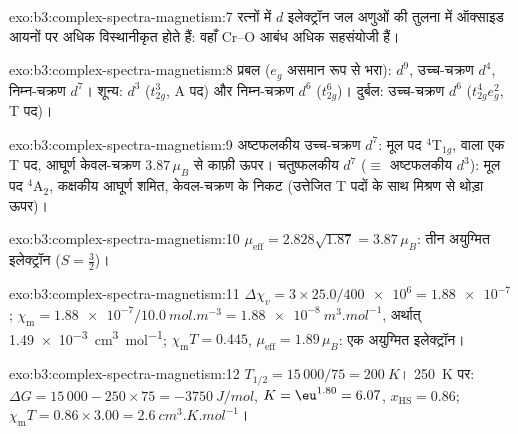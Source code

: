 \begin{solution}{exo:b3:complex-spectra-magnetism:7}
रत्नों में $d$ इलेक्ट्रॉन जल अणुओं की तुलना में ऑक्साइड आयनों पर अधिक
विस्थानीकृत होते हैं: वहाँ Cr--O आबंध अधिक सहसंयोजी हैं।
\end{solution}

\begin{solution}{exo:b3:complex-spectra-magnetism:8}
प्रबल ($e_g$ असमान रूप से भरा): $d^9$, उच्च-चक्रण $d^4$, निम्न-चक्रण $d^7$। शून्य: $d^3$ ($t_{2g}^3$, A पद) और
निम्न-चक्रण $d^6$ ($t_{2g}^6$)। दुर्बल: उच्च-चक्रण $d^6$ ($t_{2g}^4e_g^2$, T पद)।
\end{solution}

\begin{solution}{exo:b3:complex-spectra-magnetism:9}
अष्टफलकीय उच्च-चक्रण $d^7$: मूल पद $^4$T$_{1g}$,  वाला एक T पद,
आघूर्ण केवल-चक्रण $3.87\,\mu_B$ से काफ़ी ऊपर। चतुष्फलकीय $d^7$ ($\equiv$ अष्टफलकीय $d^3$): मूल
पद $^4$A$_2$, कक्षकीय आघूर्ण शमित, केवल-चक्रण के निकट (उत्तेजित T पदों के साथ मिश्रण से
थोड़ा ऊपर)।
\end{solution}

\begin{solution}{exo:b3:complex-spectra-magnetism:10}
$\mu_{\mathrm{eff}} = 2.828\sqrt{1.87} = 3.87\,\mu_B$: तीन अयुग्मित इलेक्ट्रॉन ($S = \frac32$)।
\end{solution}

\begin{solution}{exo:b3:complex-spectra-magnetism:11}
$\Delta\chi_v = 3 \times 25.0/\num{400e6} = \num{1.88e-7}$; $\chi_{\mathrm m} = \num{1.88e-7}/\qty{10.0}{mol.m^{-3}} = \qty{1.88e-8}{m^3.mol^{-1}}$, अर्थात्
\qty{1.49e-3}{cm^3.mol^{-1}}; $\chi_{\mathrm m}T = 0.445$, $\mu_{\mathrm{eff}} = 1.89\,\mu_B$: एक अयुग्मित इलेक्ट्रॉन।
\end{solution}

\begin{solution}{exo:b3:complex-spectra-magnetism:12}
$T_{1/2} = 15\,000/75 = \qty{200}{K}$। \qty{250}{K} पर: $\Delta G = 15\,000 - 250 \times 75 = \qty{-3750}{J/mol}$, $K = \eu^{1.80} = 6.07$,
$x_{\mathrm{HS}} = 0.86$; $\chi_{\mathrm m}T = 0.86 \times 3.00 = \qty{2.6}{cm^3.K.mol^{-1}}$।
\end{solution}

